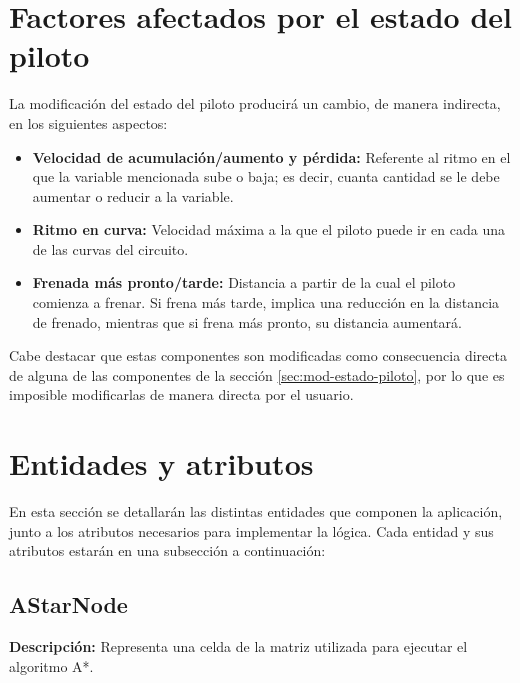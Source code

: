 \section{Factores afectados por el estado del piloto}
\label{sec:componente-estado}

La modificación del estado del piloto producirá un cambio, de manera indirecta, en los siguientes aspectos:

\begin{itemize}
    \item \textbf{Velocidad de acumulación/aumento y pérdida: }Referente al ritmo en el que la variable mencionada sube o baja; es decir, cuanta cantidad se le debe aumentar o reducir a la variable.
    \item \textbf{Ritmo en curva: }Velocidad máxima a la que el piloto puede ir en cada una de las curvas del circuito.
    \item \textbf{Frenada más pronto/tarde: }Distancia a partir de la cual el piloto comienza a frenar. Si frena más tarde, implica una reducción en la distancia de frenado, mientras que si frena más pronto, su distancia aumentará.
\end{itemize}

Cabe destacar que estas componentes son modificadas como consecuencia directa de alguna de las componentes de la sección \ref{sec:mod-estado-piloto}, por lo que es imposible modificarlas de manera directa por el usuario.

\section{Entidades y atributos}

En esta sección se detallarán las distintas entidades que componen la aplicación, junto a los atributos necesarios para implementar la lógica. Cada entidad y sus atributos estarán en una subsección a continuación:

\subsection{AStarNode}
\textbf{Descripción: }Representa una celda de la matriz utilizada para ejecutar el algoritmo A*.

